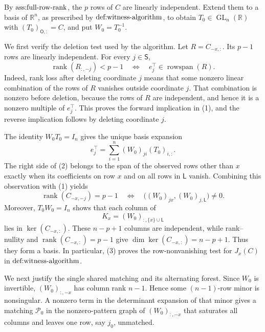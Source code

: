 By \(\textnormal{ass:full-row-rank}\), the \(p\) rows of \(C\) are linearly independent.  Extend them to a basis of \(\mathbb R^n\), as prescribed by \(\textnormal{def:witness-algorithm}\), to obtain \(T_0\in\operatorname{GL}_n(\mathbb R)\) with \((T_0)_{\mathsf O,:}=C\), and put \(W_0=T_0^{-1}\).

We first verify the deletion test used by the algorithm.  Let \(R=C_{-x,:}\).  Its \(p-1\) rows are linearly independent.  For every \(j\in\mathsf S\),
\[
 \operatorname{rank}(R_{:,-j})<p-1
 \quad\Longleftrightarrow\quad
 e_j^\top\in\operatorname{rowspan}(R).                                      \tag{1}
\]
Indeed, rank loss after deleting coordinate \(j\) means that some nonzero linear combination of the rows of \(R\) vanishes outside coordinate \(j\).  That combination is nonzero before deletion, because the rows of \(R\) are independent, and hence it is a nonzero multiple of \(e_j^\top\).  This proves the forward implication in (1), and the reverse implication follows by deleting coordinate \(j\).

The identity \(W_0T_0=I_n\) gives the unique basis expansion
\[
 e_j^\top=\sum_{i=1}^n (W_0)_{ji}(T_0)_{i,:}.                              \tag{2}
\]
The right side of (2) belongs to the span of the observed rows other than \(x\) exactly when its coefficients on row \(x\) and on all rows in \(\mathsf L\) vanish.  Combining this observation with (1) yields
\[
 \operatorname{rank}(C_{-x,-j})=p-1
 \quad\Longleftrightarrow\quad
 \bigl((W_0)_{jx},(W_0)_{j,\mathsf L}\bigr)\ne0.                            \tag{3}
\]
Moreover, \(T_0W_0=I_n\) shows that each column of
\[
 K_x=(W_0)_{:,\{x\}\cup\mathsf L}
\]
lies in \(\ker(C_{-x,:})\).  These \(n-p+1\) columns are independent, while rank--nullity and \(\operatorname{rank}(C_{-x,:})=p-1\) give
\(\dim\ker(C_{-x,:})=n-p+1\).  Thus they form a basis.  In particular, (3) proves the row-nonvanishing test for \(J_x(C)\) in \(\textnormal{def:witness-algorithm}\).

We next justify the single shared matching and its alternating forest.  Since \(W_0\) is invertible, \((W_0)_{:,-x}\) has column rank \(n-1\).  Hence some \((n-1)\)-row minor is nonsingular.  A nonzero term in the determinant expansion of that minor gives a matching \(\mathcal P_0\) in the nonzero-pattern graph of \((W_0)_{:,-x}\) that saturates all columns and leaves one row, say \(j_0\), unmatched.

